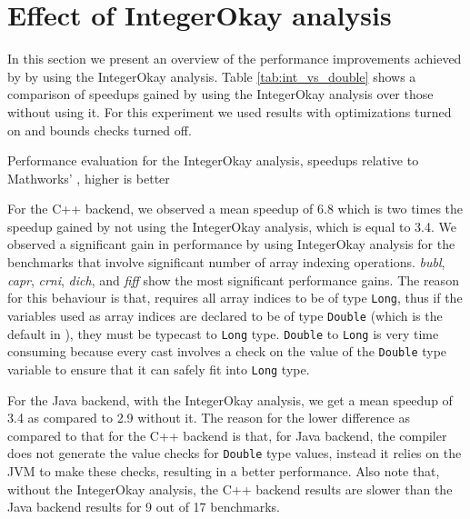 \section{Effect of IntegerOkay analysis}    
\label{sec:intok_perf}

In this section we present an overview of the performance improvements
achieved by \mixten by using the IntegerOkay analysis. Table \ref{tab:int_vs_double}
shows a comparison of speedups gained by using the IntegerOkay analysis over
those without using it. For this experiment we used results with \xten
optimizations turned on and bounds checks turned off. 
   
\begin{table}[htbp]
\begin{center} 
\begin{footnotesize}

\end{footnotesize}
\caption{Performance evaluation for the IntegerOkay
analysis, speedups relative to Mathworks' \matlab, higher is better} 
\label{tab:int_vs_double} 
\end{center} 
\end{table}

For the C++ backend, we observed a mean speedup of 6.8 which is two
times the speedup gained by not using the IntegerOkay analysis, which is equal
to 3.4. We observed a significant gain in performance by using IntegerOkay
analysis for the benchmarks that involve significant number of array indexing
operations. \emph{bubl}, \emph{capr}, \emph{crni}, \emph{dich}, and \emph{fiff} 
show the most significant performance gains. The reason for this
behaviour is that, \xten requires all array indices to be of type \texttt{Long},
thus if the variables used as array indices are declared to be of type
\texttt{Double} (which is the default in \matlab), they must be typecast to
\texttt{Long} type. \texttt{Double} to \texttt{Long} is very time consuming
because every cast involves a check on the value of the \texttt{Double} type
variable to ensure that it can safely fit into \texttt{Long} type. 

For the Java backend, with the IntegerOkay analysis, we get a mean speedup of
3.4 as compared to 2.9 without it. The reason for the lower difference as
compared to that for the C++ backend is that, for Java backend, the \xten
compiler does not generate the value checks for \texttt{Double} type values,
instead it relies on the JVM to make  these checks, resulting in a better
performance.  Also note that, without the IntegerOkay analysis, the C++ backend
results are slower than the Java backend results for 9 out of 17 benchmarks.

